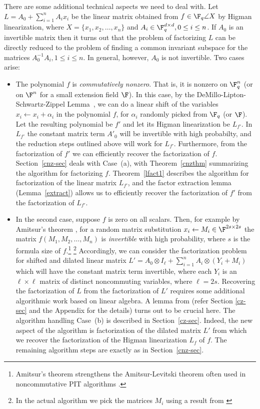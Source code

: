 There are some additional technical aspects we need to deal with. 
%
%
%
%
Let $L=A_0+\sum_{i=1}^n A_i x_i$ be the linear matrix obtained from
$f\in\F_q\angle{X}$ by Higman linearization, where
$X=\{x_1,x_2,\ldots,x_n\}$ and $A_i\in \F_q^{d\times d}, 0\le i\le
n$. If $A_0$ is an invertible matrix then it turns out that the
problem of factorizing $L$ can be directly reduced to the problem of
finding a common invariant subspace for the matrices $A_0^{-1}A_i,
1\le i\le n$.  In general, however, $A_0$ is not invertible. Two cases
arise:
\begin{itemize}
\item[(a)] The polynomial $f$ is \emph{commutatively nonzero}. That
  is, it is nonzero on $\F_q^n$ (or on $\F^n$ for a small extension
  field $\F$). In this case, by the DeMillo-Lipton-Schwartz-Zippel
  Lemma~\cite{DL78,Sch80, Zip79}, we can do a linear shift of the
  variables $x_i\leftarrow x_i+\alpha_i$ in the polynomial $f$, for
  $\alpha_i$ randomly picked from $\F_q$ (or $\F$). Let the resulting
  polynomial be $f'$ and let its Higman linearization be $L_{f'}$. In
  $L_{f'}$ the constant matrix term $A'_0$ will be invertible with
  high probabilty, and the reduction steps outlined above will work
  for $L_{f'}$. Furthermore, from the factorization of $f'$ we can
  efficiently recover the factorization of $f$. Section~\ref{cnz-sec}
  deals with Case~(a), with Theorem~\ref{cnzthm} summarizing the
  algorithm for factorizing $f$. Theorem~\ref{lfact1} describes the
  algorithm for factorization of the linear matrix $L_{f'}$, and the
  factor extraction lemma (Lemma~\ref{extract}) allows us to
  efficiently recover the factorization of $f'$ from the factorization
  of $L_{f'}$.
  
\item[(b)] In the second case, suppose $f$ is zero on all scalars. Then, for example by
  Amitsur's theorem \cite{Ami66}, for a random matrix substitution
  $x_i\leftarrow M_i\in \F^{2s\times 2s}$ the matrix
  $f(M_1,M_2,\ldots,M_n)$ is \emph{invertible} with high probability,
  where $s$ is the formula size of $f$.\footnote{Amitsur's theorem
    strengthens the Amitsur-Levitski theorem \cite{AL50} often used in
    noncommutative PIT algorithms \cite{BW05}.} \footnote{In the actual algorithm we pick the matrices $M_i$ using a result from  \cite{DM17}}   Accordingly, we can
  consider the factorization problem for shifted and dilated linear
  matrix $L'=A_0\otimes I_{\ell} + \sum_{i=1}^n A_i\otimes (Y_i+M_i)$ which             
  will have the constant matrix term invertible, where each $Y_i$ is  
  an $\ell \times \ell$ matrix of distinct noncommuting variables, where $\ell=2s$.  Recovering
  the factorization of $L$ from the factorization of $L'$ requires
  some additional algorithmic work based on linear algebra. A lemma
  from \cite{HKV20} (refer Section \ref{cz-sec} and the Appendix for the details) turns
  out to be crucial here. The algorithm handling Case~(b) is described
  in Section~\ref{cz-sec}. Indeed, the new aspect of the algorithm is
  factorization of the dilated matrix $L'$ from which we recover the
  factorization of the Higman linearization $L_f$ of $f$. The
  remaining algorithm steps are exactly as in Section~\ref{cnz-sec}.
\end{itemize}  


